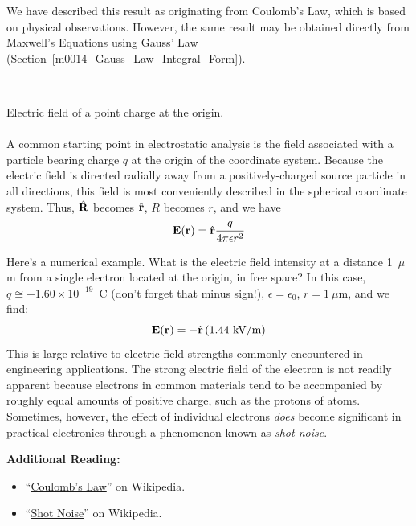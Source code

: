 We have described this result as originating from Coulomb's Law, which is based on physical observations.
However, the same result may be obtained directly from Maxwell's Equations using Gauss' Law (Section~\ref{m0014_Gauss_Law_Integral_Form}).

~\\ \begin{example} 
\begin{mdframed}[backgroundcolor=brown!20,linecolor=brown!20]\raggedright
Electric field of a point charge at the origin.
\\~\\
A common starting point in electrostatic analysis is the field associated with a particle bearing charge $q$ at the origin of the coordinate system.
Because the electric field is directed radially away from a positively-charged source particle in all directions, this field is most conveniently described in the spherical coordinate system.
Thus, $\hat{\bf R}$ becomes $\hat{\bf r}$, $R$ becomes $r$, and we have
%
\begin{equation}
{\bf E}({\bf r}) = \hat{\bf r}\frac{q}{4\pi\epsilon r^2}
\end{equation} 

Here's a numerical example. What is the electric field intensity at a distance 1~$\mu$m from a single electron located at the origin, in free space?
In this case, $q\cong -1.60 \times 10^{-19}$~C (don't forget that minus sign!), $\epsilon=\epsilon_0$, $r=1~\mu$m, and we find: 
%
\begin{equation}
{\bf E}({\bf r}) = -\hat{\bf r}\left(1.44~\mbox{kV/m}\right)
\end{equation} 
%
This is large relative to electric field strengths commonly encountered in engineering applications.
The strong electric field of the electron is not readily apparent because electrons in common materials tend to be accompanied by roughly equal amounts of positive charge, such as the protons of atoms.
Sometimes, however, the effect of individual electrons {\it does} become significant in practical electronics through a phenomenon known as \emph{shot noise}.
\end{mdframed}\end{example}

{\bf Additional Reading:}
\begin{itemize}
\item ``\href{https://en.wikipedia.org/wiki/Coulomb's_law}{Coulomb's Law}'' on Wikipedia.
\item ``\href{https://en.wikipedia.org/wiki/Shot_noise}{Shot Noise}'' on Wikipedia.
\end{itemize}

